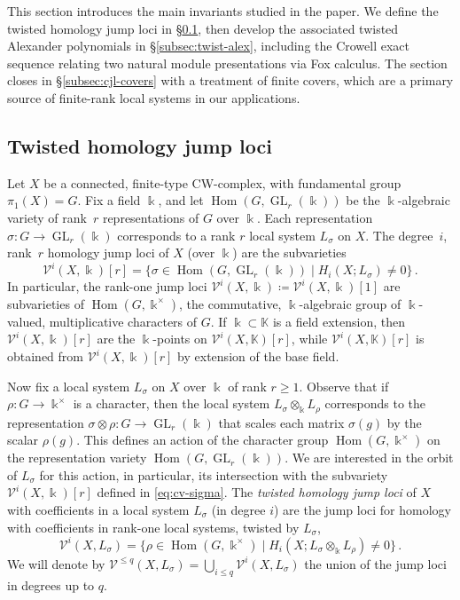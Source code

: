 \documentclass[11pt]{amsart}
\theoremstyle{definition}
\newcommand{\K}{\mathbb{K}}
\renewcommand{\k}{\Bbbk}
\newcommand{\VV}{\mathcal{V}}
\DeclareMathOperator{\GL}{GL}
\DeclareMathOperator{\Hom}{{Hom}}
\begin{document}
This section introduces the main invariants studied in the paper.
We define the twisted homology jump loci in \S\ref{subsec:twist-cjl}, 
then develop the associated twisted Alexander polynomials in 
\S\ref{subsec:twist-alex}, including the Crowell exact sequence 
relating two natural module presentations via Fox calculus.
The section closes in \S\ref{subsec:cjl-covers} with a treatment 
of finite covers, which are a primary source of finite-rank 
local systems in our applications.

\subsection{Twisted homology jump loci}
\label{subsec:twist-cjl}
Let $X$ be a connected, finite-type CW-complex, with fundamental 
group $\pi_1(X)=G$. Fix a field $\k$, and let $\Hom(G,\GL_r(\k))$ be 
the $\k$-algebraic variety of rank~$r$ representations of $G$ over $\k$.  
Each representation $\sigma\colon G\to \GL_r(\k)$ corresponds to a rank $r$ 
local system $L_{\sigma}$ on $X$. The degree~$i$, rank~$r$ homology jump 
loci of $X$ (over $\k$) are the subvarieties 
%
\begin{equation}
\label{eq:cv-sigma}
\VV^i(X,\k)[r]=\big\{\sigma \in \Hom(G,\GL_r(\k)) \mid  
H_i(X; L_{\sigma}) \ne 0\big\}\, .
\end{equation}
In particular, the rank-one jump loci $\VV^i(X,\k)\coloneqq\VV^i(X,\k)[1]$ 
are subvarieties of $\Hom(G,\k^{\times})$, the commutative, 
$\k$-algebraic group of $\k$-valued, multiplicative characters of $G$.
If $\k\subset \K$ is a field extension, then $\VV^i(X,\k)[r]$ are the 
$\k$-points on $\VV^i(X,\K)[r]$, while $\VV^i(X,\K)[r]$ is obtained from 
$\VV^i(X,\k)[r]$ by extension of the base field. 

Now fix a local system $L_\sigma$ on $X$ over $\k$ of rank $r\geq 1$. 
Observe that if $\rho\colon G\to \k^{\times}$ is a character, then the 
local system $L_{\sigma}\otimes_{\k} L_{\rho}$ corresponds to 
the representation $\sigma\otimes \rho\colon G\to \GL_r(\k)$ that scales each 
matrix $\sigma(g)$ by the scalar $\rho(g)$. This defines an action of the 
character group $\Hom(G,\k^{\times})$ on the representation variety 
$\Hom(G,\GL_r(\k))$. We are interested in the orbit of $L_\sigma$ 
for this action, in particular, its intersection with the subvariety 
$\VV^i(X,\k)[r]$ defined in \eqref{eq:cv-sigma}. The {\em twisted 
homology jump loci}\/ of $X$ with coefficients in 
a local system $L_\sigma$ (in degree $i$) are the jump loci for 
homology with coefficients in rank-one local systems, twisted by $L_\sigma$, 
\begin{equation}
\label{eq:cvx}
\VV^i(X,L_\sigma)=\big\{\rho \in \Hom(G,\k^{\times}) \mid  
H_i(X; L_\sigma\otimes_{\k} L_{\rho}) \ne 0\big\}\, .
\end{equation}
We will denote by $\VV^{\le q}(X,L_\sigma)=\bigcup_{i\le q} \VV^i(X,L_\sigma)$ 
the union of the jump loci in degrees up to $q$. 
\end{document}
